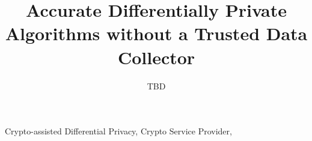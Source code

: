 \documentclass[conference]{IEEEtran}
\title{Accurate Differentially Private Algorithms without a Trusted Data Collector}
\author{TBD}
\begin{document}
\maketitle

\begin{abstract}

\end{abstract}

\begin{IEEEkeywords}
Crypto-assisted Differential Privacy, Crypto Service Provider, 
\end{IEEEkeywords}








\end{document}
